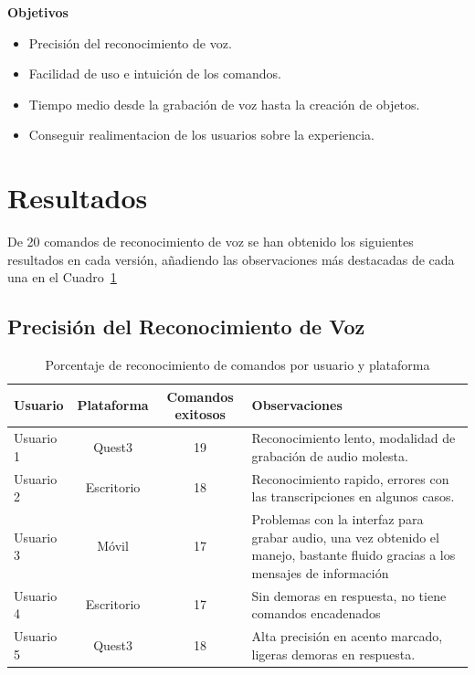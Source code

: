 \documentclass[a4paper, 12pt]{book}
\begin{document}
\textbf{Objetivos}
\begin{itemize}
 \item Precisión del reconocimiento de voz.
 \item Facilidad de uso e intuición de los comandos.
 \item Tiempo medio desde la grabación de voz hasta la creación de objetos.
 \item Conseguir realimentacion de los usuarios sobre la experiencia.
\end{itemize}
\section{Resultados}
De 20 comandos de reconocimiento de voz se han obtenido los siguientes resultados en cada versión, añadiendo las observaciones más destacadas de cada una en el Cuadro~\ref{tab:precision_comandos}
\subsection{Precisión del Reconocimiento de Voz}

\begin{table}[H]
\centering
\begin{tabular}{|l|c|c|p{6cm}|}
\hline
\textbf{Usuario} & \textbf{Plataforma} & \textbf{Comandos exitosos} & \textbf{Observaciones} \\
\hline
Usuario 1 & Quest3 & 19 & Reconocimiento lento, modalidad de grabación de audio molesta. \\
\hline
Usuario 2 & Escritorio  & 18 & Reconocimiento rapido, errores con las transcripciones en algunos casos. \\
\hline
Usuario 3 & Móvil & 17 & Problemas con la interfaz para grabar audio, una vez obtenido el manejo, bastante fluido gracias a los mensajes de información \\
\hline
Usuario 4 & Escritorio  & 17 & Sin demoras en respuesta, no tiene comandos encadenados \\
\hline
Usuario 5 & Quest3 & 18 & Alta precisión en acento marcado, ligeras demoras en respuesta. \\
\hline
\end{tabular}
\caption{Porcentaje de reconocimiento de comandos por usuario y plataforma}
\label{tab:precision_comandos}
\end{table}
\end{document}
